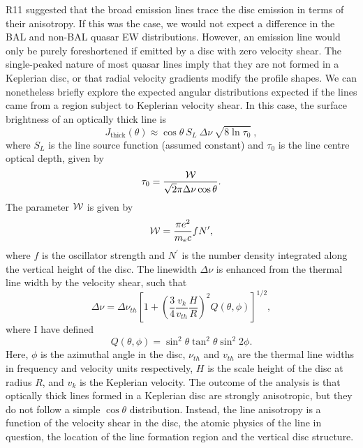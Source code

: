 R11 suggested that the broad emission lines trace the disc
emission in terms of their anisotropy. 
If this was the case, we would not expect a difference in the BAL and non-BAL
quasar EW distributions. However, an emission line would only be purely 
foreshortened if emitted by a disc with zero velocity shear. 
The single-peaked nature of most quasar lines imply that they are not
formed in a Keplerian disc, or that radial velocity gradients modify the profile 
shapes. We can nonetheless briefly explore the expected angular distributions
expected if the lines came from a region subject to
Keplerian velocity shear. In this case, the surface brightness of an optically thick 
line is \citep{hornemarsh1986}
\begin{equation}
J_{\mathrm{thick}}(\theta) \approx \cos \theta~S_L~\Delta \nu~\sqrt{8 \ln \tau_0} \ ,
\end{equation}
where $S_L$ is the line source function (assumed constant) and
$\tau_0$ is the line centre optical depth, given by
\begin{equation}
\tau_0 = \frac{{\cal W}}{\sqrt{2}\pi \Delta \nu \cos \theta}.
\end{equation}
The parameter ${{\cal W}}$ is given by
\begin{equation}
{{\cal W}} = \frac{\pi e^2}{m_e c}f N^\prime,
\end{equation}
where $f$ is the oscillator strength and $N^\prime$ is the number
density integrated along the vertical height of the disc. The linewidth
$\Delta \nu$ is enhanced from the thermal line width by the velocity shear, such
that
\begin{equation}
\Delta \nu = \Delta \nu_{th} \left[1 + 
\left(\frac{3}{4}\frac{v_{k}}{v_{th}}\frac{H}{R}\right)^2
Q(\theta, \phi)
\right]^{1/2},
\end{equation}
where I have defined
\begin{equation}
Q(\theta, \phi) =
\sin^2 \theta \tan^2 \theta \sin^2 2 \phi.
\end{equation}
Here, $\phi$ is the azimuthal angle in the disc, $\nu_{th}$ and $v_{th}$ are the 
thermal line widths in frequency and velocity units respectively, 
$H$ is the scale height of the disc at radius $R$, and $v_k$ is the
Keplerian velocity. The outcome of the \cite{hornemarsh1986} analysis is that optically thick lines 
formed in a Keplerian disc are strongly anisotropic, but they do not follow a simple 
$\cos \theta$ distribution. Instead, the line anisotropy is
a function of the velocity shear in the disc, the atomic physics of
the line in question, the location of the line formation region 
and the vertical disc structure. 

